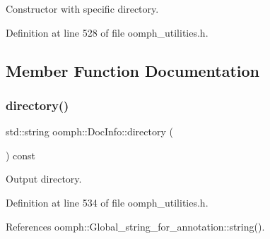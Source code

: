 Constructor with specific directory. 



Definition at line 528 of file oomph\+\_\+utilities.\+h.



\subsection{Member Function Documentation}
\mbox{\label{classoomph_1_1DocInfo_a85d58bcfce0a7b7cae461624e6fcd08a}} 
\subsubsection{\texorpdfstring{directory()}{directory()}}
{\footnotesize\ttfamily std\+::string oomph\+::\+Doc\+Info\+::directory (\begin{DoxyParamCaption}{ }\end{DoxyParamCaption}) const\hspace{0.3cm}{\ttfamily [inline]}}



Output directory. 



Definition at line 534 of file oomph\+\_\+utilities.\+h.



References oomph\+::\+Global\+\_\+string\+\_\+for\+\_\+annotation\+::string().



